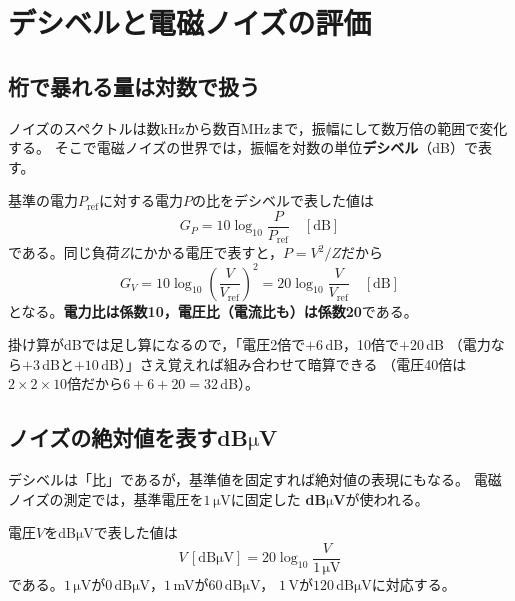 \section{デシベルと電磁ノイズの評価}
\label{sec11.3}

\subsection{桁で暴れる量は対数で扱う}

ノイズのスペクトルは数kHzから数百MHzまで，振幅にして数万倍の範囲で変化する。
そこで電磁ノイズの世界では，振幅を対数の単位\textbf{デシベル}（dB）で表す。

\begin{定義}[デシベル]
\label{def11.2}
基準の電力$P_{\mathrm{ref}}$に対する電力$P$の比をデシベルで表した値は
\begin{equation}
G_P = 10 \log_{10} \frac{P}{P_{\mathrm{ref}}}\quad \mathrm{[dB]}
\label{eq11.5}
\end{equation}
である。同じ負荷$Z$にかかる電圧で表すと，$P = V^2/Z$だから
\begin{equation}
G_V = 10 \log_{10} \left( \frac{V}{V_{\mathrm{ref}}} \right)^{\!2}
= 20 \log_{10} \frac{V}{V_{\mathrm{ref}}}\quad \mathrm{[dB]}
\label{eq11.6}
\end{equation}
となる。\textbf{電力比は係数10，電圧比（電流比も）は係数20}である。
\end{定義}

掛け算がdBでは足し算になるので，「電圧2倍で$+6$\,dB，10倍で$+20$\,dB
（電力なら$+3$\,dBと$+10$\,dB）」さえ覚えれば組み合わせて暗算できる
（電圧40倍は$2\times2\times10$倍だから$6+6+20 = 32$\,dB）。

\subsection{ノイズの絶対値を表すdB$\mathrm{\mu}$V}

デシベルは「比」であるが，基準値を固定すれば絶対値の表現にもなる。
電磁ノイズの測定では，基準電圧を$1\,\mathrm{\mu V}$に固定した
\textbf{dB$\mathrm{\mu}$V}が使われる。

\begin{定義}[dB$\mathrm{\mu}$V]
\label{def11.3}
電圧$V$をdB$\mathrm{\mu}$Vで表した値は
\begin{equation}
V\,[\mathrm{dB\mu V}] = 20 \log_{10} \frac{V}{1\,\mathrm{\mu V}}
\label{eq11.7}
\end{equation}
である。$1\,\mathrm{\mu V}$が$0$\,dB$\mathrm{\mu}$V，$1$\,mVが$60$\,dB$\mathrm{\mu}$V，
$1$\,Vが$120$\,dB$\mathrm{\mu}$Vに対応する。
\end{定義}

